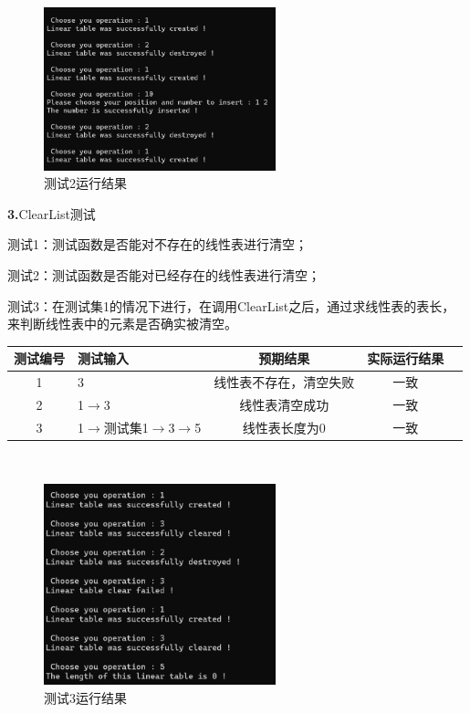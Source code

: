 \documentclass[supercite]{Experimental_Report}
\theoremstyle{definition}
\begin{document}
~\

 \begin{figure}[H]
 	\centering
 	\includegraphics[width=0.6\textwidth]{images/线性表测试2.png}
 	\caption{测试2运行结果}
 	\label{txlab}
 \end{figure}


\noindent\textbf{ 3.}ClearList测试

测试1：测试函数是否能对不存在的线性表进行清空；

测试2：测试函数是否能对已经存在的线性表进行清空；

测试3：在测试集1的情况下进行，在调用ClearList之后，通过求线性表的表长，来判断线性表中的元素是否确实被清空。

\vspace{0.5em}

\begin{tabular}{|c|l|c|c|c|}
	\hline
	测试编号 & 测试输入 & 预期结果 & 实际运行结果 \\
	\hline
	1 & 3 & 线性表不存在，清空失败 & 一致 \\
	\hline
	2 & 1$\rightarrow$3 & 线性表清空成功 & 一致 \\
	\hline
	3 & 1$\rightarrow$测试集1$\rightarrow$3$\rightarrow$5 & 线性表长度为0 & 一致 \\
	\hline
\end{tabular}

~\

 \begin{figure}[H]
 	\centering
 	\includegraphics[width=0.6\textwidth]{images/线性表测试3.png}
 	\caption{测试3运行结果}
 	\label{txlab}
 \end{figure}
\end{document}

